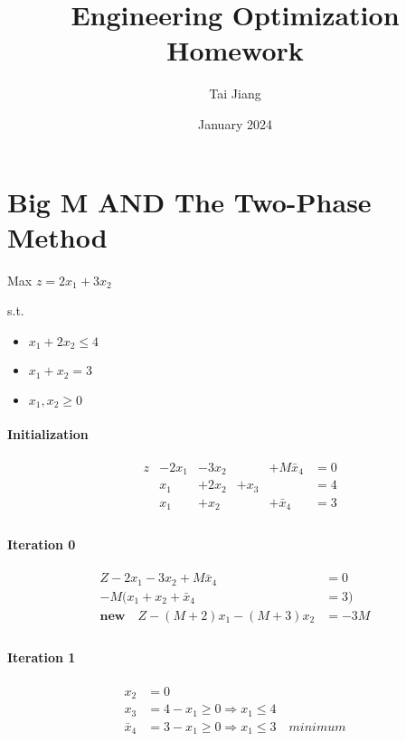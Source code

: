 \documentclass{article}
\title{Engineering Optimization Homework}
\author{Tai Jiang}
\date{January 2024}
\begin{document}
  \maketitle
  \section{Big M AND The Two-Phase Method}
  Max $z = 2x_1 + 3x_2$


  s.t.
  \begin{itemize}
    \item $x_1 + 2x_2 \leq 4$
    \item $x_1 + x_2 = 3$
    \item $x_1, x_2 \geq 0$
  \end{itemize}

\paragraph{Initialization}

\begin{equation}
  \begin{aligned}
    &z  &-2x_1 &-3x_2 & &+M\bar{x}_4 &= 0 \\
    & &x_1  &+2x_2  &+x_3  &  &= 4 \\
    & &x_1  &+x_2  &  &+\bar{x}_4 &= 3 \\
  \end{aligned}
\end{equation}

\paragraph{Iteration 0}

\begin{equation}
  \begin{aligned}
    Z -2x_1 -3x_2 + M \bar{x}_4 &= 0 \\
    -M( x_1 + x_2 + \bar{x}_4 &= 3) \\
    \textbf{new} \quad Z - (M + 2)x_1 - (M+3)x_2 &= -3M \\
  \end{aligned}
\end{equation}

\paragraph{Iteration 1}

\begin{equation}
  \begin{aligned}
    x_2 &= 0 \\
    x_3 &= 4 - x_1 \geq 0 \Rightarrow x_1 \leq 4 \\
    \bar{x}_4 &= 3 - x_1 \geq 0 \Rightarrow x_1 \leq 3 \quad minimum \\
  \end{aligned}
\end{equation}
\end{document}
